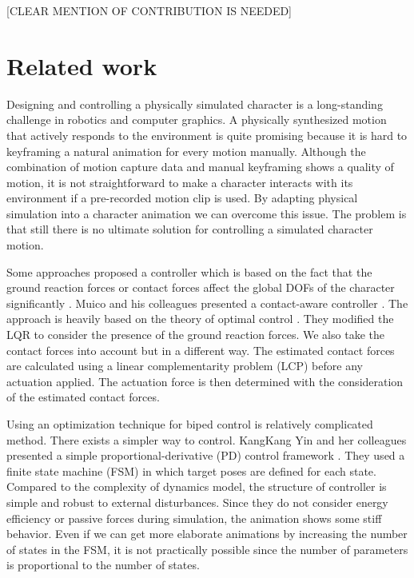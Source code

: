 \documentclass[a4paper,10pt]{article}
\begin{document}
[CLEAR MENTION OF CONTRIBUTION IS NEEDED]


\pagebreak

\section{Related work}
Designing and controlling a physically simulated character is a long-standing
challenge in robotics and computer graphics. A physically
synthesized motion that actively responds to the environment is quite
promising because it is hard to keyframing a natural animation for every motion
manually. Although the combination of motion capture data and manual keyframing
shows a quality of motion, it is not straightforward to make a character 
interacts with its environment if a pre-recorded motion clip is used.
By adapting physical simulation into a character animation we can overcome
this issue. The problem is that still there is no ultimate solution for controlling
a simulated character motion.

Some approaches proposed a controller which is based on the fact
that the ground reaction forces or contact forces affect the global
DOFs of the character significantly \cite{SCA07:249-258:2007, journals/tog/MuicoLPP09}.
Muico and his colleagues
presented a contact-aware controller \cite{journals/tog/MuicoLPP09}.
The approach is
heavily based on the theory of optimal control \cite{lewis}.
They modified the LQR to consider the presence of the ground reaction forces.
We also take the contact forces into account but in a different way.
The estimated contact forces are calculated using a linear complementarity
problem (LCP) before any actuation applied. The actuation force is then
determined with the consideration of the estimated contact forces.

Using an optimization technique for biped control is relatively complicated method.
There exists a simpler way to control. KangKang Yin and her colleagues
presented a simple proportional-derivative (PD) control framework \cite{journals/tog/YinLP07}.
They used a finite state machine (FSM) in which target poses are defined
for each state. Compared to the complexity of dynamics model,
the structure of controller is simple and robust to external disturbances.
Since they do not consider energy efficiency or passive forces during
simulation, the animation shows some stiff behavior.
Even if we can get more elaborate animations by increasing
the number of states in the FSM, it is not practically possible since the
number of parameters is proportional to the number of states.
\end{document}
